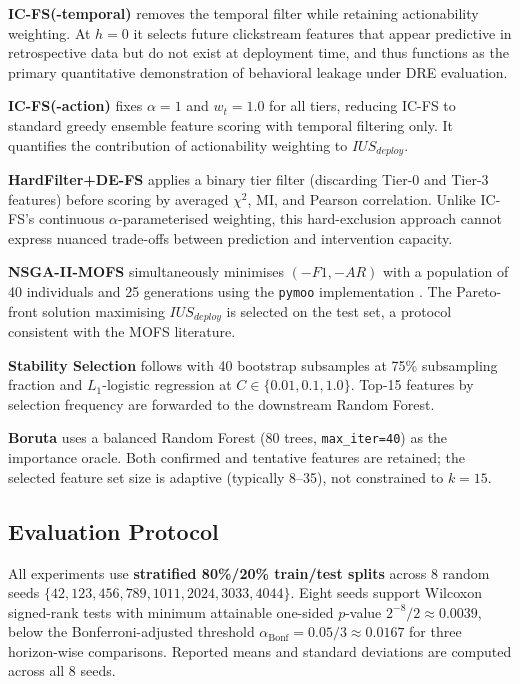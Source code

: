 \documentclass[a4paper,fleqn]{cas-sc}
\begin{document}
\textbf{IC-FS(-temporal)} removes the temporal filter while retaining actionability
weighting. At $h=0$ it selects future clickstream features that appear predictive
in retrospective data but do not exist at deployment time, and thus functions as the
primary quantitative demonstration of behavioral leakage under DRE evaluation.

\textbf{IC-FS(-action)} fixes $\alpha=1$ and $w_t=1.0$ for all tiers,
reducing IC-FS to standard greedy ensemble feature scoring with temporal
filtering only. It quantifies the contribution of actionability weighting to $IUS_{deploy}$.

\textbf{HardFilter+DE-FS} applies a binary tier filter (discarding Tier-0 and Tier-3
features) before scoring by averaged $\chi^2$, MI, and Pearson correlation.
Unlike IC-FS's continuous $\alpha$-parameterised weighting, this hard-exclusion
approach cannot express nuanced trade-offs between prediction and intervention capacity.

\textbf{NSGA-II-MOFS} simultaneously minimises $(-F1, -AR)$ with a population of 40
individuals and 25 generations using the \texttt{pymoo} implementation \cite{blank2020}.
The Pareto-front solution maximising $IUS_{deploy}$ is selected on the test set,
a protocol consistent with the MOFS literature.

\textbf{Stability Selection} follows \citet{meinshausen2010} with 40 bootstrap
subsamples at 75\% subsampling fraction and $L_1$-logistic regression at
$C \in \{0.01, 0.1, 1.0\}$. Top-15 features by selection frequency are forwarded
to the downstream Random Forest.

\textbf{Boruta} \cite{kursa2010} uses a balanced Random Forest (80 trees,
\texttt{max\_iter=40}) as the importance oracle. Both confirmed and tentative
features are retained; the selected feature set size is adaptive (typically 8--35),
not constrained to $k=15$.

\subsection{Evaluation Protocol}

All experiments use \textbf{stratified 80\%/20\% train/test splits} across
8 random seeds $\{42, 123, 456, 789, 1011, 2024, 3033, 4044\}$.
Eight seeds support Wilcoxon signed-rank tests with minimum attainable one-sided
$p$-value $2^{-8}/2 \approx 0.0039$, below the Bonferroni-adjusted threshold
$\alpha_{\text{Bonf}} = 0.05/3 \approx 0.0167$ for three horizon-wise comparisons.
Reported means and standard deviations are computed across all 8 seeds.
\end{document}

